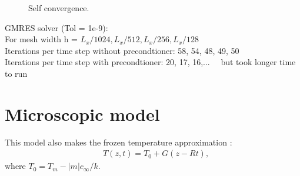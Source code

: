 \documentclass[a4paper,12pt]{article}
\begin{document}
\begin{figure}[!ht]
     \hfill
     \caption{Self convergence. }
     \label{fig:nolat_convergence}
   \end{figure}
GMRES solver (Tol = 1e-9):\\
For mesh width h =  $ L_x/1024, L_x/512, L_x/256, L_x/128 $\\
Iterations per time step without precondtioner: 58, 54, 48, 49, 50\\
Iterations per time step with precondtioner: 20, 17, 16,...      \ \        but took longer time to run

\newpage

\section{Microscopic model}

This model also makes the frozen temperature approximation \cite{Tourret2015,Echebarria2010,Plapp2007,Echebarria2004}:
\begin{align}
    & T(z,t) = T_0 + G(z-Rt),
\end{align}
where $T_0 = T_m - |m|c_{\infty}/k$. 
\end{document}
